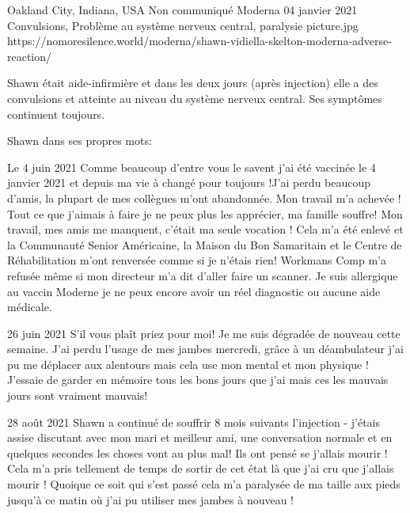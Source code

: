 {Oakland City, Indiana, USA}
{Non communiqué}
{Moderna}
{04 janvier 2021}
{Convulsions, Problème au système nerveux central, paralysie}
{picture.jpg}
{https://nomoresilence.world/moderna/shawn-vidiella-skelton-moderna-adverse-reaction/}
{

Shawn était aide-infirmière et dans les deux jours (après injection) elle a des
convulsions et atteinte au niveau du système nerveux central. Ses symptômes
continuent toujours.

Shawn dans ses propres mots:

Le 4 juin 2021 Comme beaucoup d’entre vous le savent j’ai été vaccinée le 4
janvier 2021 et depuis ma vie à changé pour toujours !J’ai perdu beaucoup
d’amis, la plupart de mes collègues m’ont abandonnée. Mon travail m’a achevée !
Tout ce que j’aimais à faire je ne peux plus les apprécier, ma famille souffre!
Mon travail, mes amis me manquent, c’était ma seule vocation ! Cela m’a été
enlevé et la Communauté Senior Américaine, la Maison du Bon Samaritain et le
Centre de Réhabilitation m’ont renversée comme si je n’étais rien! Workmans Comp
m’a refusée même si mon directeur m’a dit d’aller faire un scanner. Je suis
allergique au vaccin Moderne je ne peux encore avoir un réel diagnostic ou
aucune aide médicale.

26 juin 2021 S’il vous plaît priez pour moi! Je me suis dégradée de nouveau
cette semaine. J’ai perdu l’usage de mes jambes mercredi, grâce à un
déambulateur j’ai pu me déplacer aux alentours mais cela use mon mental et mon
physique ! J’essaie de garder en mémoire tous les bons jours que j’ai mais ces
les mauvais jours sont vraiment mauvais!

28 août 2021 Shawn a continué de souffrir 8 mois suivants l’injection - j’étais
assise discutant avec mon mari et meilleur ami, une conversation normale et en
quelques secondes les choses vont au plus mal! Ils ont pensé se j’allais mourir
! Cela m’a pris tellement de temps de sortir de cet état là que j’ai cru que
j’allais mourir ! Quoique ce soit qui s’est passé cela m’a paralysée de ma
taille aux pieds jusqu’à ce matin où j’ai pu utiliser mes jambes à nouveau !

}
